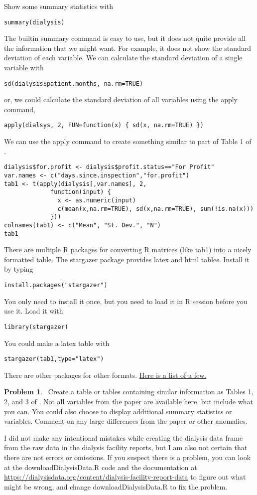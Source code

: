 \documentclass[11pt,reqno,letter]{article}
\renewcommand{\cite}{\citet}
\theoremstyle{definition}
\theoremstyle{problem}
\newtheorem{prob}{Problem}
\newenvironment{problem} 
  {\begin{mdframed}\begin{prob}$\,$}
  {\end{prob}\end{mdframed}}
\begin{document}
Show some summary statistics with
\begin{lstlisting}
summary(dialysis)
\end{lstlisting}
The builtin summary command is easy to use, but it does not quite
provide all the information that we might want. For example, it does
not show the standard deviation of each variable. We can calculate the
standard deviation of a single variable with
\begin{lstlisting}
sd(dialysis$patient.months, na.rm=TRUE)
\end{lstlisting}
or, we could calculate the standard deviation of all variables using
the apply command,
\begin{lstlisting}
apply(dialsys, 2, FUN=function(x) { sd(x, na.rm=TRUE) })
\end{lstlisting}
We can use the apply command to create something similar to part of
Table 1 of \cite{grieco2017}.
\begin{lstlisting}
dialysis$for.profit <- dialysis$profit.status=="For Profit"
var.names <- c("days.since.inspection","for.profit")
tab1 <- t(apply(dialysis[,var.names], 2, 
             function(input) {
               x <- as.numeric(input)
               c(mean(x,na.rm=TRUE), sd(x,na.rm=TRUE), sum(!is.na(x)))
             }))
colnames(tab1) <- c("Mean", "St. Dev.", "N")
tab1
\end{lstlisting}
There are multiple R packages for converting R matrices (like tab1)
into a nicely formatted table. The stargazer package provides latex
and html tables. Install it by typing
\begin{lstlisting}
install.packages("stargazer")
\end{lstlisting}
You only need to install it once, but you need to load it in R session
before you use it. Load it with
\begin{lstlisting}
library(stargazer)
\end{lstlisting}
You could make a latex table with 
\begin{lstlisting}
stargazer(tab1,type="latex")
\end{lstlisting}
There are other packages for other
formats. \href{http://rmarkdown.rstudio.com/lesson-7.html} {Here is a
  list of a few.} 

\begin{problem}
  Create a table or tables containing similar information as Tables 1,
  2, and 3 of \cite{grieco2017}. Not all variables from the paper are
  available here, but include what you can.  You could also choose to
  display additional summary statistics or variables. Comment on any
  large differences from the paper or other anomalies.
  
  I did not make any intentional mistakes while creating the dialysis
  data frame from the raw data in the dialysis facility reports, but I
  am also not certain that there are not errors or omissions. If you
  suspect there is a problem, you can look at the
  downloadDialysisData.R code and the documentation at
  \url{https://dialysisdata.org/content/dialysis-facility-report-data}
  to figure out what might be wrong, and change downloadDialysisData.R
  to fix the problem. 
\end{problem}
\end{document}
